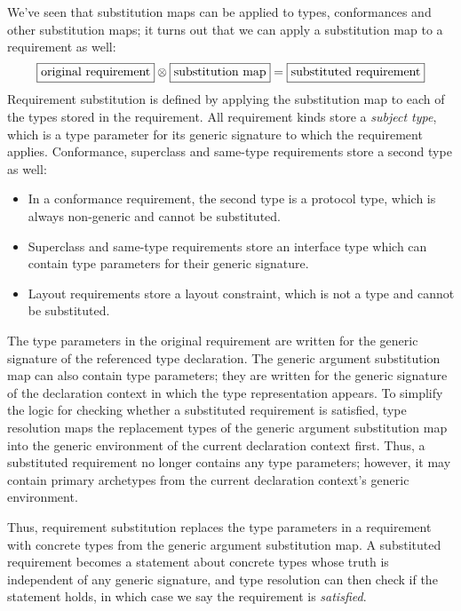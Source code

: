 \documentclass[../generics]{subfiles}
\begin{document}
We've seen that substitution maps can be applied to types, conformances and other substitution maps; it turns out that we can apply a substitution map to a requirement as well:
\[\mathboxed{original requirement}\otimes\mathboxed{substitution map} = \mathboxed{substituted requirement}\]
Requirement substitution is defined by applying the substitution map to each of the types stored in the requirement. All requirement kinds store a \emph{subject type}, which is a type parameter for its generic signature to which the requirement applies. Conformance, superclass and same-type requirements store a second type as well:
\begin{itemize}
\item In a conformance requirement, the second type is a protocol type, which is always non-generic and cannot be substituted.
\item Superclass and same-type requirements store an interface type which can contain type parameters for their generic signature.
\item Layout requirements store a layout constraint, which is not a type and cannot be substituted.
\end{itemize}

The type parameters in the original requirement are written for the generic signature of the referenced type declaration. The generic argument substitution map can also contain type parameters; they are written for the generic signature of the declaration context in which the type representation appears. To simplify the logic for checking whether a substituted requirement is satisfied, type resolution maps the replacement types of the generic argument substitution map into the generic environment of the current declaration context first. Thus, a substituted requirement no longer contains any type parameters; however, it may contain primary archetypes from the current declaration context's generic environment.

Thus, requirement substitution replaces the type parameters in a requirement with concrete types from the generic argument substitution map. A substituted requirement becomes a statement about concrete types whose truth is independent of any generic signature, and type resolution can then check if the statement holds, in which case we say the requirement is \emph{satisfied}.
\end{document}
